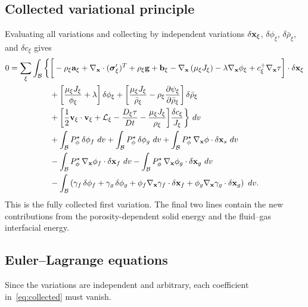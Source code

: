 \subsection{Collected variational principle}

Evaluating all variations and collecting by independent variations $\delta\mathbf{x}_\xi$, $\delta\phi_\xi$, $\delta\bar\rho_\xi$, and $\delta c_\xi$ gives
\begin{align}
  0 = \sum_\xi \int_{\mathcal{B}} \bigg\{
  &\bigg[-\rho_\xi\mathbf{a}_\xi + \nabla_{\mathbf{x}}\cdot(\boldsymbol{\sigma}'_\xi)^T + \rho_\xi\mathbf{g} + \mathbf{b}_\xi
  - \nabla_{\mathbf{x}}\left(\mu_\xi J_\xi\right) - \lambda\nabla_{\mathbf{x}}\phi_\xi + c^+_\xi\nabla_{\mathbf{x}}\tau
  \bigg]\cdot\delta\mathbf{x}_\xi \notag \\
  &+ \bigg[\frac{\mu_\xi J_\xi}{\phi_\xi} + \lambda\bigg] \,\delta\phi_\xi
  + \bigg[\frac{\mu_\xi J_\xi}{\bar\rho_\xi} - \rho_\xi\frac{\partial \psi_\xi}{\partial \bar\rho_\xi}\bigg] \,\delta\bar\rho_\xi \notag \\
  &+ \bigg[\frac{1}{2}\mathbf{v}_\xi\cdot\mathbf{v}_\xi + \mathcal{L}_\xi - \frac{D_\xi\tau}{Dt} - \frac{\mu_\xi J_\xi}{\rho_\xi}\bigg]\frac{\delta c_\xi}{J_\xi}
  \bigg\} \,\,dv \notag \\
  &+ \int_{\mathcal{B}} P^\star_\phi\, \delta\phi_f \,\,dv + \int_{\mathcal{B}} P^\star_\phi\, \delta\phi_g \,\,dv
  + \int_{\mathcal{B}} P^\star_\phi\, \nabla_{\mathbf{x}}\phi \cdot \delta\mathbf{x}_s \,\,dv \notag \\
  &- \int_{\mathcal{B}} P^\star_\phi\, \nabla_{\mathbf{x}}\phi_f \cdot \delta\mathbf{x}_f \,\,dv - \int_{\mathcal{B}} P^\star_\phi\, \nabla_{\mathbf{x}}\phi_g \cdot \delta\mathbf{x}_g \,\,dv \notag \\
  &- \int_{\mathcal{B}} \left(\gamma_f\,\delta\phi_f
      + \gamma_g\,\delta\phi_g
      + \phi_f\nabla_{\mathbf{x}}\gamma_f\cdot\delta\mathbf{x}_f
      + \phi_g\nabla_{\mathbf{x}}\gamma_g\cdot\delta\mathbf{x}_g\right) \,\,dv.
  \label{eq:collected}
\end{align}
This is the fully collected first variation.  The final two lines contain the new contributions from the porosity-dependent solid energy and the fluid--gas interfacial energy.

\subsection{Euler--Lagrange equations}

Since the variations are independent and arbitrary, each coefficient in~\eqref{eq:collected} must vanish.

